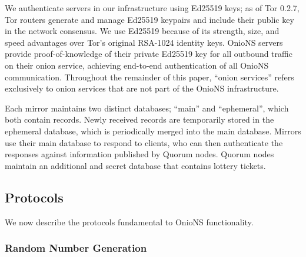 \documentclass[USenglish,oneside,twocolumn]{article}
\begin{document}
We authenticate servers in our infrastructure using Ed25519 \cite{bernstein2012high} keys; as of Tor 0.2.7, Tor routers generate and manage Ed25519 keypairs and include their public key in the network consensus. We use Ed25519 because of its strength, size, and speed advantages over Tor's original RSA-1024 identity keys. OnioNS servers provide proof-of-knowledge of their private Ed25519 key for all outbound traffic on their onion service, achieving end-to-end authentication of all OnioNS communication. Throughout the remainder of this paper, ``onion services'' refers exclusively to onion services that are not part of the OnioNS infrastructure.

Each mirror maintains two distinct databases; ``main'' and ``ephemeral'', which both contain records. Newly received records are temporarily stored in the ephemeral database, which is periodically merged into the main database. Mirrors use their main database to respond to clients, who can then authenticate the responses against information published by Quorum nodes. Quorum nodes maintain an additional and secret database that contains lottery tickets.





\subsection{Protocols}
\label{sec:protocols}

We now describe the protocols fundamental to OnioNS functionality.%


\subsubsection{Random Number Generation}
\label{sec:rngProcess}
\end{document}
